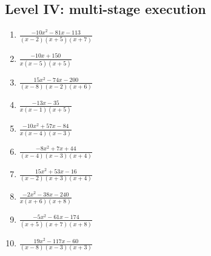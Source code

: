 \documentclass[11pt,oneside]{book}
\begin{document}
\subsection*{Level IV: multi-stage execution}
\begin{enumerate}[leftmargin=*,label=\textbf{\arabic*.},itemsep=0.65\baselineskip]
\item $\displaystyle \frac{- 10 x^{2} - 81 x - 113}{\left(x - 2\right) \left(x + 5\right) \left(x + 7\right)}$
\item $\displaystyle \frac{- 10 x + 150}{x \left(x - 5\right) \left(x + 5\right)}$
\item $\displaystyle \frac{15 x^{2} - 74 x - 200}{\left(x - 8\right) \left(x - 2\right) \left(x + 6\right)}$
\item $\displaystyle \frac{- 13 x - 35}{x \left(x - 1\right) \left(x + 5\right)}$
\item $\displaystyle \frac{- 10 x^{2} + 57 x - 84}{x \left(x - 4\right) \left(x - 3\right)}$
\item $\displaystyle \frac{- 8 x^{2} + 7 x + 44}{\left(x - 4\right) \left(x - 3\right) \left(x + 4\right)}$
\item $\displaystyle \frac{15 x^{2} + 53 x - 16}{\left(x - 2\right) \left(x + 3\right) \left(x + 4\right)}$
\item $\displaystyle \frac{- 2 x^{2} - 38 x - 240}{x \left(x + 6\right) \left(x + 8\right)}$
\item $\displaystyle \frac{- 5 x^{2} - 61 x - 174}{\left(x + 5\right) \left(x + 7\right) \left(x + 8\right)}$
\item $\displaystyle \frac{19 x^{2} - 117 x - 60}{\left(x - 8\right) \left(x - 3\right) \left(x + 3\right)}$
\end{enumerate}
\end{document}
